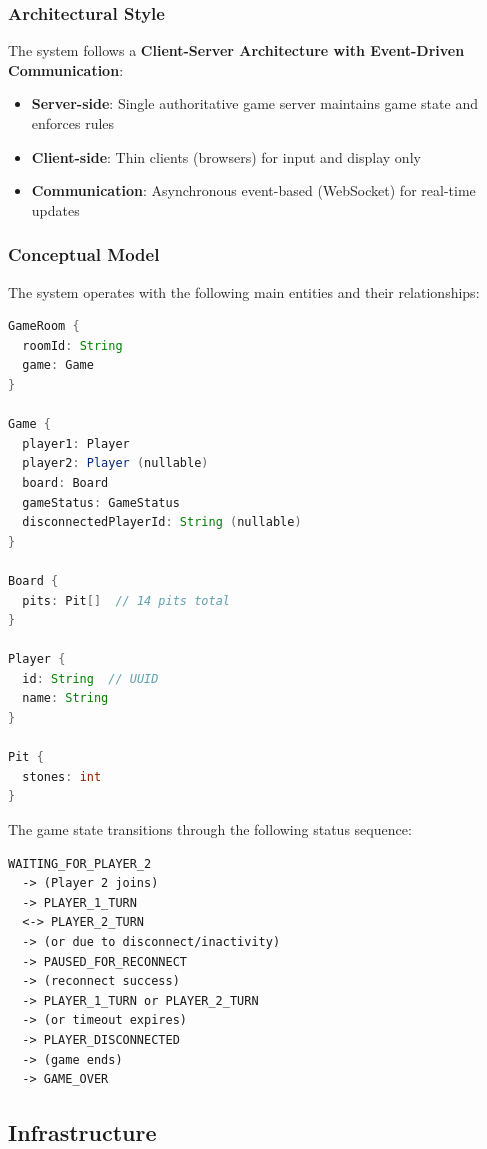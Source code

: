 \documentclass{scrartcl}
\begin{document}
\subsubsection{Architectural Style}

The system follows a \textbf{Client-Server Architecture with Event-Driven Communication}:

\begin{itemize}
  \item \textbf{Server-side}: Single authoritative game server maintains game state and enforces rules
  \item \textbf{Client-side}: Thin clients (browsers) for input and display only
  \item \textbf{Communication}: Asynchronous event-based (WebSocket) for real-time updates
\end{itemize}


\subsubsection{Conceptual Model}

The system operates with the following main entities and their relationships:

\begin{lstlisting}[language=java]
GameRoom {
  roomId: String
  game: Game
}

Game {
  player1: Player
  player2: Player (nullable)
  board: Board
  gameStatus: GameStatus
  disconnectedPlayerId: String (nullable)
}

Board {
  pits: Pit[]  // 14 pits total
}

Player {
  id: String  // UUID
  name: String
}

Pit {
  stones: int
}
\end{lstlisting}

The game state transitions through the following status sequence:

\begin{lstlisting}
WAITING_FOR_PLAYER_2
  -> (Player 2 joins)
  -> PLAYER_1_TURN
  <-> PLAYER_2_TURN
  -> (or due to disconnect/inactivity)
  -> PAUSED_FOR_RECONNECT
  -> (reconnect success)
  -> PLAYER_1_TURN or PLAYER_2_TURN
  -> (or timeout expires)
  -> PLAYER_DISCONNECTED
  -> (game ends)
  -> GAME_OVER
\end{lstlisting}

\subsection{Infrastructure}\label{infrastructure}
\end{document}
